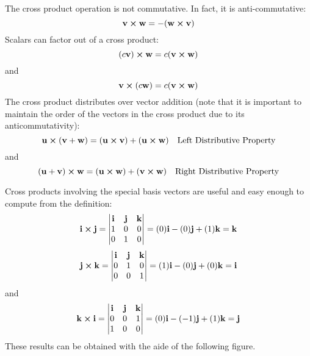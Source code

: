 \documentclass[handout]{ximera}
\begin{document}
The cross product operation is not commutative.  In fact, it is anti-commutative:
\[
\mathbf{v} \boldsymbol\times \mathbf{w} = -(\mathbf{w} \boldsymbol\times \mathbf{v})
\]
Scalars can factor out of a cross product:
\[
(c\mathbf{v}) \boldsymbol\times \mathbf{w} = c(\mathbf{v} \boldsymbol\times \mathbf{w})
\]
and
\[
\mathbf{v} \boldsymbol\times (c\mathbf{w}) = c(\mathbf{v} \boldsymbol\times \mathbf{w})
\]
The cross product distributes over vector addition 
(note that it is important to maintain the order of the vectors in the cross product due to its anticommutativity):
\[
\mathbf{u} \boldsymbol\times (\mathbf{v} + \mathbf{w}) = (\mathbf{u} \boldsymbol\times \mathbf{v}) + (\mathbf{u} \boldsymbol\times \mathbf{w})\quad \text{Left Distributive Property}
\]
and
\[
(\mathbf{u} + \mathbf{v}) \boldsymbol\times \mathbf{w} = (\mathbf{u} \boldsymbol\times \mathbf{w}) + (\mathbf{v} \boldsymbol\times \mathbf{w})\quad \text{Right Distributive Property}
\]

Cross products involving the special basis vectors are useful and easy enough to compute from the definition:
\[
\mathbf{i} \boldsymbol\times \mathbf{j}=
 \begin{vmatrix}
\mathbf{i} & \mathbf{j} & \mathbf{k}\\
1 & 0 & 0\\
0 & 1 & 0
\end{vmatrix}
= (0)\mathbf{i} - (0)\mathbf{j} + (1)\mathbf{k} = \mathbf{k}
\]
\[
\mathbf{j} \boldsymbol\times \mathbf{k}=
 \begin{vmatrix}
\mathbf{i} & \mathbf{j} & \mathbf{k}\\
0 & 1 & 0\\
0 & 0 & 1
\end{vmatrix}
= (1)\mathbf{i} - (0)\mathbf{j} + (0)\mathbf{k} = \mathbf{i}
\]
and
\[
\mathbf{k} \boldsymbol\times \mathbf{i}=
 \begin{vmatrix}
\mathbf{i} & \mathbf{j} & \mathbf{k}\\
0 & 0 & 1\\
1 & 0 & 0
\end{vmatrix}
= (0)\mathbf{i} - (-1)\mathbf{j} + (1)\mathbf{k} = \mathbf{j}
\]
These results can be obtained with the aide of the following figure.
\begin{image}
\end{image}
\end{document}
